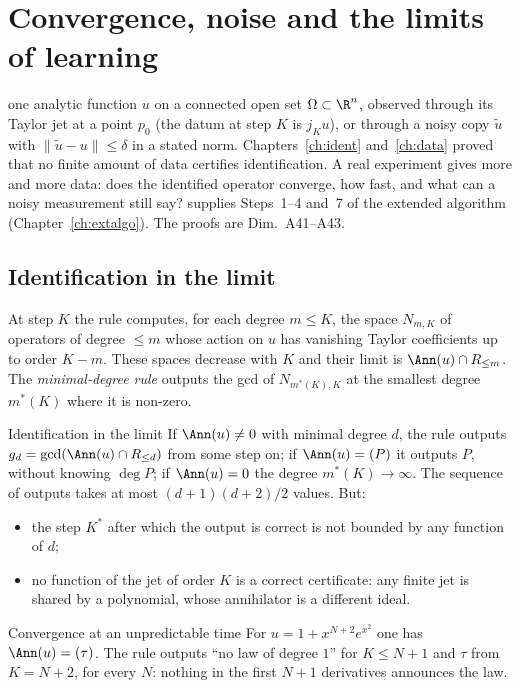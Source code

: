 \chapter{Convergence, noise and the limits of learning}\label{ch:convergence}
\chapterbrief
{one analytic function $u$ on a connected open set $\Omega\subset\R^n$, observed through its Taylor jet at a point $p_0$ (the datum at step $K$ is $j_Ku$), or through a noisy copy $\tilde u$ with $\|\tilde u-u\|\le\delta$ in a stated norm.}
{Chapters~\ref{ch:ident} and~\ref{ch:data} proved that no finite amount of data certifies identification. A real experiment gives more and more data: does the identified operator converge, how fast, and what can a noisy measurement still say?}
{supplies Steps~1--4 and~7 of the extended algorithm (Chapter~\ref{ch:extalgo}). The proofs are Dim.~A41--A43.}

\section{Identification in the limit}

At step $K$ the rule computes, for each degree $m\le K$, the space $N_{m,K}$ of operators of degree $\le m$ whose action on $u$ has vanishing Taylor coefficients up to order $K-m$. These spaces decrease with $K$ and their limit is $\Ann(u)\cap R_{\le m}$. The \emph{minimal-degree rule} outputs the gcd of $N_{m^*(K),K}$ at the smallest degree $m^*(K)$ where it is non-zero.

\begin{theorem}{Identification in the limit  \proved}\label{thm:convt1}
If $\Ann(u)\ne0$ with minimal degree $d$, the rule outputs $g_d=\gcd(\Ann(u)\cap R_{\le d})$ from some step on; if $\Ann(u)=(P)$ it outputs $P$, without knowing $\deg P$; if $\Ann(u)=0$ the degree $m^*(K)\to\infty$. The sequence of outputs takes at most $(d+1)(d+2)/2$ values. But:
\begin{itemize}
\item the step $K^*$ after which the output is correct is not bounded by any function of $d$;
\item no function of the jet of order $K$ is a correct certificate: any finite jet is shared by a polynomial, whose annihilator is a different ideal.
\end{itemize}
\end{theorem}

\begin{example}{Convergence at an unpredictable time}
For $u=1+x^{N+2}e^{x^2}$ one has $\Ann(u)=(\tau)$. The rule outputs ``no law of degree $1$'' for $K\le N+1$ and $\tau$ from $K=N+2$, for every $N$: nothing in the first $N+1$ derivatives announces the law.
\end{example}


